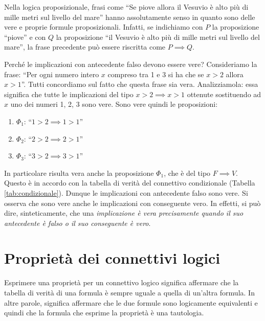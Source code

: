 \begin{example}
	Nella logica proposizionale, frasi come ``Se piove allora il Vesuvio è alto più di mille metri sul livello del mare'' hanno assolutamente senso in quanto sono delle vere e proprie formule proposizionali. Infatti, se indichiamo con $P$ la proposizione ``piove'' e con $Q$ la proposizione ``il Vesuvio è alto più di mille metri sul livello del mare'', la frase precedente può essere riscritta come $P \implies Q$.
\end{example}

\begin{osservation}
	Perché le implicazioni con antecedente falso devono essere vere? Consideriamo la frase: ``Per ogni numero intero $x$ compreso tra 1 e 3 si ha che se $x>2$ allora $x>1$''. Tutti concordiamo sul fatto che questa frase sia vera. Analizziamola: essa significa che tutte le implicazioni del tipo $x>2 \implies x>1$ ottenute sostituendo ad $x$ uno dei numeri 1, 2, 3 sono vere. Sono vere quindi le proposizioni:
	\begin{enumerate}[itemjoin={,\quad}]
		\item $\Phi_{1}$: ``$1>2 \implies 1>1$''
		\item $\Phi_{2}$: ``$2>2 \implies 2>1$''
		\item $\Phi_{3}$: ``$3>2 \implies 3>1$''
	\end{enumerate}
	In particolare risulta vera anche la proposizione $\Phi_{1}$, che è del tipo $F \implies V$. Questo è in accordo con la tabella di verità del connettivo condizionale (Tabella \ref{tab:condizionale}). Dunque le implicazioni con antecedente falso sono vere. Si osserva che sono vere anche le implicazioni con conseguente vero. In effetti, si può dire, sinteticamente, che una \textit{implicazione è vera precisamente quando il suo antecedente è falso o il suo conseguente è vero}.
\end{osservation}

\section{Proprietà dei connettivi logici}\label{proprietà_connettivi}
Esprimere una proprietà per un connettivo logico significa affermare che la tabella di verità di una formula è sempre uguale a quella di un'altra formula. In altre parole, significa affermare che le due formule sono logicamente equivalenti e quindi che la formula che esprime la proprietà è una tautologia.


